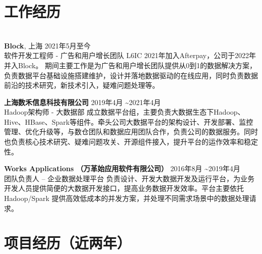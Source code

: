\documentclass{res}[8.5pt]
\begin{document}
\thispagestyle{empty} %

\address{{\bf 地址:} 虹口区天宝路466弄, 200086 \hspace{0.25in}  {\bf 电话:} 18017661124 \hspace{0.25in}  {\bf   Email:} dd.famous@gmail.com}

\begin{resume}

\section{{工作经历}}
\vspace{-12pt}
\hrulefill\\
{\bf Block}, 上海 \hfill 2021年5月至今 \\
软件开发工程师 - 广告和用户增长团队 L6IC  \hspace{0.25in} 2021年加入Afterpay，公司于2022年并入Block。
期间主要工作是为广告和用户增长团队提供从0到1的数据解决方案，负责数据平台基础设施搭建维护，设计并落地数据驱动的在线应用，同时负责数据前沿的技术研究，新技术引入，疑难问题处理等。

\vspace{-10pt}
{\bf 上海数禾信息科技有限公司} \hfill 2019年4月  \textasciitilde 2021年4月\\
Hadoop架构师 - 大数据部    \hspace{0.25in} 
成立数据平台组，主要负责大数据生态下Hadoop、Hive、HBase、Spark等组件。牵头公司大数据平台的架构设计、开发部署、监控管理、优化升级等，与数仓团队和数据应用团队合作，负责公司的数据服务。同时也负责核心技术研究、疑难问题攻关、开源组件接入，提升平台的运作效率和稳定性。

\vspace{-10pt}
{\bf Works Applications （万革始应用软件有限公司）} \hfill 2016年8月 \textasciitilde 2019年4月\\
团队负责人 – 企业数据处理平台 \hspace{0.25in} 
负责设计、开发大数据开发及运行平台，为业务开发人员提供简便的大数据开发接口，提高业务数据开发效率。平台主要依托 Hadoop/Spark 提供高效低成本的并发方案，并处理不同需求场景中的数据处理请求。

\vspace{-10pt}
\section{{项目经历（近两年）}}
\vspace{-12pt}
\hrulefill\\


\end{resume}
\end{document}
